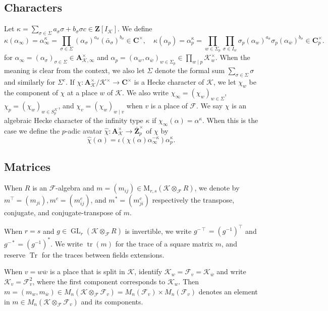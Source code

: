 \documentclass[leqno]{amsart}
\theoremstyle{definition}
\theoremstyle{remark}
\newcommand{\Z}{{\mathbf{Z}}}
\newcommand{\C}{\mathbf C}
\newcommand{\A}{\mathbf A}
\DeclareMathOperator{\Tr}{Tr}
\DeclareMathOperator{\GL}{GL}
\DeclareMathOperator{\mtr}{tr}
\newcommand{\F}{{\mathcal{F}}} %
\newcommand{\K}{{\mathcal{K}}} %
\newcommand{\bw}{{\overline{w}}}
\begin{document}
\subsection{Characters}

Let $\kappa=\sum_{\sigma\in \Sigma} 
a_\sigma\sigma+b_\sigma\sigma c\in \Z[I_\K]$. We define 
\[
    \kappa(\alpha_\infty)=\alpha_\infty^\kappa=
    \prod_{\sigma\in \Sigma} 
    (\alpha_\sigma)^{a_\sigma}(\bar{\alpha}_\sigma)^{b_\sigma}\in \C^\times,\quad
    \kappa(\alpha_p)=\alpha_p^\kappa=
    \prod_{w\in \Sigma_p}
    \prod_{\sigma\in I_w}
    \sigma_p(\alpha_w)^{a_\sigma}\sigma_p(\alpha_{\bw})^{b_\sigma}
    \in \C_p^\times.
\]
for $\alpha_\infty=(\alpha_\sigma)_{\sigma\in\Sigma}
\in \A_{\K,\infty}^\times$
and $\alpha_p=(\alpha_w,\alpha_{\bw})_{w\in\Sigma_p}\in 
\prod_{w\mid p}\K_w^\times$.
When the meaning is clear from the context, we also 
let $\Sigma$ denote the formal sum $\sum_{\sigma\in\Sigma}\sigma$
and similarly for $\Sigma^c$.
If $\chi\colon \A_\K^\times/\K^\times\to \C^\times$ 
is a Hecke character of $\K$,
we let $\chi_w$ be the component of $\chi$ at a place $w$ of $\K$.
We also write  $\chi_\infty=(\chi_w)_{w\in\Sigma}$,
$\chi_p=(\chi_w)_{w\in S_p^\K}$, and
$\chi_v=(\chi_w)_{w\mid v}$ when $v$ is a place of $\F$.
We say $\chi$ is an algebraic Hecke character of
the infinity type $\kappa$ if
$\chi_\infty(\alpha)=\alpha^\kappa$.
When this is the case we define the $p$-adic avatar 
$\hat{\chi}\colon \A_\K^\times\to \bar{\Z}_p^\times$  of $\chi$ by
\[
    \hat{\chi}(\alpha)=
    \iota(\chi(\alpha)\alpha_\infty^{-\kappa})\alpha_p^{\kappa}.
\]
 



\subsection{Matrices}
When $R$ is an $\F$-algebra and 
$m=(m_{ij})\in \text{M}_{r,s}(\K\otimes_\F R)$,
we denote by 
$m^\intercal=(m_{ji}), 
m^c=(m^c_{ij})$, and
$m^*=(m^c_{ji})$
respectively the transpose, conjugate, and conjugate-transpose of $m$.

When $r=s$ and $g\in \GL_r(\K\otimes_\F R)$ is invertible, we write
$g^{-\intercal}=(g^{-1})^\intercal$ and $g^{-*}=(g^{-1})^*$.
We write $\mtr(m)$ for the trace of a square matrix $m$,
and reserve $\Tr$ for the traces between fields extensions.

When $v=w\bw$ is a place that is split in $\K$,
identify $\K_w=\F_v=\K_{\bw}$ and 
write $\K_v=\F_v^2$, 
where the first component corresponds to $\K_w$.
Then $m=(m_w,m_{\bw})\in M_n(\K\otimes_\F\F_v)=M_n(\F_v)\times M_n(\F_v)$ 
denotes an element in $m\in M_n(\K\otimes_\F\F_v)$ and its components.
\end{document}
